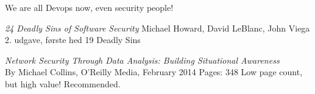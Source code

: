 \documentclass[20pt,landscape,a4paper,footrule]{foils}
\begin{document}
\centerline{We are all Devops now, even security people!}




\begin{list1}


\item \emph{24 Deadly Sins of Software Security}
Michael Howard, David LeBlanc, John Viega 2. udgave, første hed 19 Deadly Sins

\item \emph{Network Security Through Data Analysis: Building Situational Awareness}\\
By Michael Collins, O'Reilly Media, February 2014 Pages: 348
Low page count, but high value! Recommended.
\end{list1}


\myquestionspage
\end{document}
